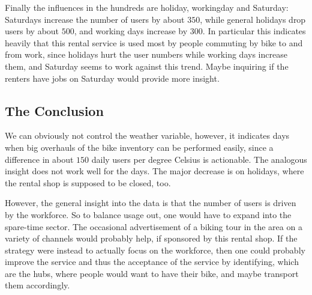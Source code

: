 \documentclass[11pt,oneside,a4paper]{scrartcl} %
\begin{document}
Finally the influences in the hundreds are holiday, workingday and Saturday:
Saturdays increase the number of users by about $350$, while general holidays
drop users by about $500$, and working days increase by $300$. In particular
this indicates heavily that this rental service is used most by people commuting 
by bike to and from work, since holidays hurt the user numbers while working days
increase them, and Saturday seems to work against this trend. Maybe inquiring if the
renters have jobs on Saturday would provide more insight.

\subsection*{The Conclusion}
We can obviously not control the weather variable, however, it indicates
days when big overhauls of the bike inventory can be performed easily, since a
difference in about $150$ daily users per degree Celsius is actionable. The
analogous insight does not work well for the days. The major decrease is on holidays,
where the rental shop is supposed to be closed, too.

However, the general insight into the data is that the number of users is driven 
by the workforce. So to balance usage out, one would have to expand into the spare-time
sector. The occasional advertisement of a biking tour in the area on a variety of
channels would probably help, if sponsored by this rental shop. If the strategy were
instead to actually focus on the workforce, then one could probably improve the
service and thus the acceptance of the service by identifying, which are the hubs, where
people would want to have their bike, and maybe transport them accordingly.
\end{document}
